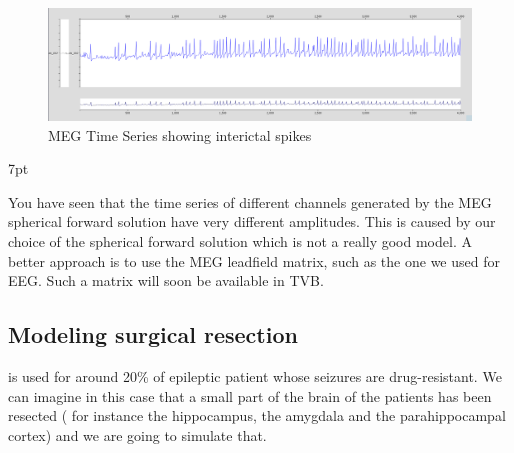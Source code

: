 \documentclass{tufte-handout}
\newenvironment{blah}{%
  \def\FrameCommand{%
    \hspace{1pt}%
    {\color{DarkOrange}\vrule width 2pt}%
    {\color{PeachPuff}\vrule width 4pt}%
    \colorbox{PeachPuff}%
  }%
  \MakeFramed{\advance\hsize-\width\FrameRestore}%
  \noindent\hspace{-4.55pt}%
  \begin{adjustwidth}{}{7pt}%
  \vspace{2pt}\vspace{2pt}%
}
{%
  \vspace{2pt}\end{adjustwidth}\endMakeFramed%
}
\begin{document}
\begin{figure}[h]
  \includegraphics[width=\linewidth]{Handout_UI_ModellingAnEpilepticPatient_MEGTimeSeries}%
  \caption{MEG Time Series showing interictal spikes}%
  \label{fig:ts_meg}%
\end{figure}

\begin{blah}
You have seen that the time series of different channels generated by the MEG spherical forward solution have very different amplitudes. This is caused
by our choice of the spherical forward solution which is not a really good model. A better approach is to use the MEG leadfield matrix, such as the one we used for EEG. Such a matrix will soon be available in TVB.
\end{blah}

\subsection{Modeling surgical resection}

 is used for around 20\% of epileptic patient whose seizures are drug-resistant. We can imagine in this case that a small part of the brain of the patients 
has been resected ( for instance the hippocampus, the amygdala and the parahippocampal cortex) and 
we are going to simulate that.
\end{document}
